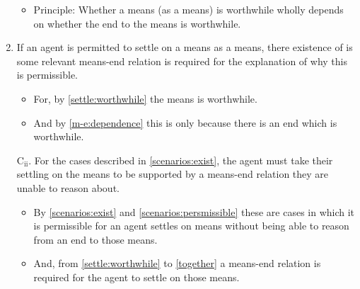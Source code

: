 \documentclass[10pt]{article}
\begin{document}
\begin{enumerate}
  \begin{itemize}
  \item Principle: Whether a means (as a means) is worthwhile wholly depends on whether the end to the means is worthwhile.
  \end{itemize}

\item\label{together} If an agent is permitted to settle on a means as a means, there existence of is some relevant means-end relation is required for the explanation of why this is permissible.
  \begin{itemize}
  \item For, by \ref{settle:worthwhile} the means is worthwhile.
  \item And by \ref{m-e:dependence} this is only because there is an end which is worthwhile.
  \end{itemize}
\item[C\(_{\text{ii}}\).] For the cases described in \ref{scenarios:exist}, the agent must take their settling on the means to be supported by a means-end relation they are unable to reason about.
  \begin{itemize}
  \item By \ref{scenarios:exist} and \ref{scenarios:persmissible} these are cases in which it is permissible for an agent settles on means without being able to reason from an end to those means.
  \item  And, from \ref{settle:worthwhile} to \ref{together} a means-end relation is required for the agent to settle on those means.
  \end{itemize}

\end{enumerate}







\end{document}
